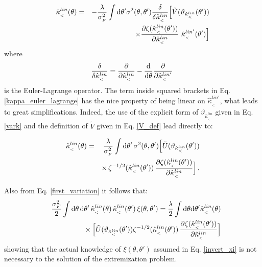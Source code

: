 \documentclass[twocolumn,aps,reprint, nofootinbib]{revtex4}
\newcommand{\dd}{{\rm d}}
\newcommand{\hkappa}{\hat{\kappa}_{_<}}
\newcommand{\tU}{\tilde{U}}
\newcommand{\tV}{\tilde{V}}
\newcommand{\vark}{\vartheta_{\hkappa^{lin}}}
\begin{document}
\begin{eqnarray}
\label{kappa_euler_lagrange}
\hkappa^{lin} (\theta) & = & - \frac{\lambda}{\sigma_{_F}^2} \int \dd \theta' \sigma^2(\theta, \theta') \frac{\delta}{\delta \hkappa^{lin}} \Big[  \tV(\vark(\theta')) \nonumber\\ & & \times \frac{\partial\zeta(\hkappa^{lin}(\theta'))}{\partial \hkappa^{lin}} \ \hkappa^{lin'}(\theta') \Big]
\end{eqnarray}
where
\begin{equation}
\frac{\delta}{\delta \hkappa^{lin}} = \frac{\partial}{\partial \hkappa^{lin}} - \frac{\dd}{\dd \theta} \frac{\partial}{\partial \hkappa^{lin'}} \, 
\end{equation}
is the Euler-Lagrange operator. The term inside squared brackets in Eq. \eqref{kappa_euler_lagrange} has the nice property of being linear on $\hkappa^{lin'}$, what leads to great simplifications. Indeed, the use of the explicit form of $\vark$ given in Eq. \eqref{vark} and the definition of $\tV$ given in Eq. \eqref{V_def} lead directly to:

\begin{eqnarray}
\label{kappa_lin_int}
\hkappa^{lin} (\theta) & = &  \frac{\lambda}{\sigma_{_F}^2} \int \dd \theta' \, \sigma^2(\theta, \theta')  \Big[ \tU(\vark (\theta'))   \nonumber\\ & & \times \, \zeta^{-1/2} (\hkappa^{lin} (\theta')) \,  \frac{\partial \zeta (\hkappa^{lin} (\theta'))}{\partial \hkappa^{lin}} \Big] \, .
\end{eqnarray}

Also from Eq. \eqref{first_variation} it follows that:
\begin{eqnarray}
& & \frac{\sigma^2_{F}}{2} \int \dd \theta \, \dd \theta' \, \hkappa^{lin} (\theta) \, \hkappa^{lin} (\theta') \, \xi(\theta, \theta') = \frac{\lambda}{2} \int \dd \theta \dd \theta'  \hkappa^{lin} (\theta) \nonumber\\ & &  \phantom{aaa} \times  \Big[\tU(\vark (\theta'))\zeta^{-1/2} (\hkappa^{lin} (\theta')) \,  \frac{\partial \zeta (\hkappa^{lin} (\theta'))}{\partial \hkappa^{lin}} \Big] 
\end{eqnarray}
showing that the actual knowledge of $\xi(\theta, \theta')$ assumed in Eq. \eqref{invert_xi} is not necessary to the solution of the extremization problem.
\end{document}
